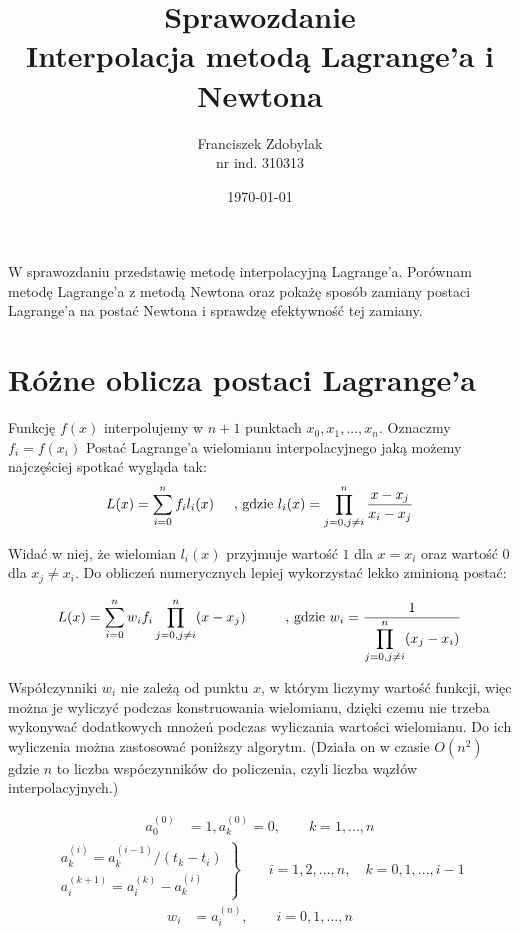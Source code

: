 \documentclass[a4paper]{article}
\author{Franciszek Zdobylak \\ \small{nr ind. 310313}}
\title{\LARGE{Sprawozdanie} \\ \normalsize{Interpolacja metodą Lagrange'a i Newtona}}
\date{\today}
\begin{document}
\maketitle
\abstract
W sprawozdaniu przedstawię metodę interpolacyjną Lagrange'a.
Porównam metodę Lagrange'a z metodą Newtona oraz pokażę sposób zamiany postaci
Lagrange'a na postać Newtona i sprawdzę efektywność tej zamiany.

\section{Różne oblicza postaci Lagrange'a}

Funkcję $f(x)$ interpolujemy w $n+1$ punktach $x_0, x_1, ..., x_n$. Oznaczmy $f_i = f(x_i)$
Postać Lagrange'a wielomianu interpolacyjnego jaką możemy najczęściej spotkać
wygląda tak:
\color{red}
$$ L(x) = \sum_{i=0}^{n} f_i l_i(x) 
\text{\hspace{0.5cm}, gdzie } 
l_i(x) = \prod_{j=0,j\neq i}^n \frac{x - x_j}{x_i - x_j}$$
\color{black}

Widać w niej, że wielomian $ l_i(x) $ przyjmuje wartość $ 1 $ dla $ x = x_i $
oraz wartość $ 0 $ dla $ x_j \neq x_i $. Do obliczeń numerycznych lepiej
wykorzystać lekko zminioną postać:

\color{red}
$$ L(x) = \sum_{i=0}^n w_if_i \prod_{j=0, j \neq i} ^n (x - x_j) 
\text{\hspace{1cm}, gdzie } w_i = \frac{1}{\displaystyle\prod_{j=0, j\neq i}^{n}(x_j - x_i)}$$


Współczynniki $w_i$ nie zależą od punktu $x$, w którym liczymy wartość funkcji, więc można je 
wyliczyć podczas konstruowania wielomianu, dzięki czemu nie trzeba wykonywać
dodatkowych mnożeń podczas wyliczania wartości wielomianu. Do ich wyliczenia można zastosować 
poniższy algorytm. (Działa on w czasie $O(n^2)$ gdzie $n$ to liczba wspóczynników 
do policzenia, czyli liczba wązłów interpolacyjnych.)

\begin{align*}
    a_0^{(0)} &= 1, a_k^{(0)} = 0, \qquad k = 1,...,n
\end{align*}
\begin{align*}
    \left. \begin{array}{l}
    a_k^{(i)} = a_k^{(i - 1)} / (t_k - t_i)\\
    a_i^{(k+1)} = a_i^{(k)} - a_k^{(i)}
  \end{array} 
  \right\} \qquad i = 1,2,...,n,\quad k = 0,1,...,i-1
\end{align*}
\begin{align*}
    w_i  &= a_i^{(n)}, \qquad i = 0,1,...,n
\end{align*}
\end{document}
